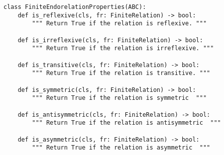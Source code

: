 \begin{verbatim}
class FiniteEndorelationProperties(ABC):
    def is_reflexive(cls, fr: FiniteRelation) -> bool:
        """ Return True if the relation is reflexive. """

    def is_irreflexive(cls, fr: FiniteRelation) -> bool:
        """ Return True if the relation is irreflexive. """

    def is_transitive(cls, fr: FiniteRelation) -> bool:
        """ Return True if the relation is transitive. """

    def is_symmetric(cls, fr: FiniteRelation) -> bool:
        """ Return True if the relation is symmetric  """

    def is_antisymmetric(cls, fr: FiniteRelation) -> bool:
        """ Return True if the relation is antisymmetric  """

    def is_asymmetric(cls, fr: FiniteRelation) -> bool:
        """ Return True if the relation is asymmetric  """
\end{verbatim}